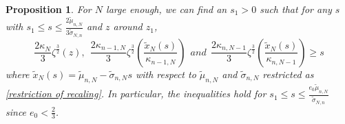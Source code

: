 \documentclass[11pt]{article}
\newtheorem{proposition}[theorem]{Proposition}
\numberwithin{equation}{section}%
\numberwithin{theorem}{section}
\begin{document}
  \begin{proposition}\label{B4z}
      For $N$ large enough, we can find an $s_1>0$ such that for any $s$ with $s_1\le s\le \frac{2\tilde{\mu}_{n,N}}{3\tilde{\sigma}_{N,n}}$ and $z$ around $z_1$,
      \begin{equation*}
          \frac{2\kappa_N}{3}\zeta^\frac{3}{2}(z),~~\frac{2\kappa_{n-1,N}}{3}\zeta^\frac{3}{2}\left(\frac{\tilde{x}_N(s)}{\kappa_{n-1,N}}\right)~~and~~\frac{2\kappa_{n,N-1}}{3}\zeta^\frac{3}{2}\left(\frac{\tilde{x}_N(s)}{\kappa_{n,N-1}}\right)\ge s
      \end{equation*}
      where $\tilde{x}_N(s)=\tilde{\mu}_{n,N}-\tilde{\sigma}_{n,N}s$ with respect to $\tilde{\mu}_{n,N}$ and $\tilde{\sigma}_{n,N}$ restricted as \eqref{restriction of recaling}. In particular, the inequalities hold for $s_1\le s\le \frac{e_0\tilde{\mu}_{n,N}}{\tilde{\sigma}_{N,n}}$ since $e_0<\frac{2}{3}$.
  \end{proposition}
\end{document}
